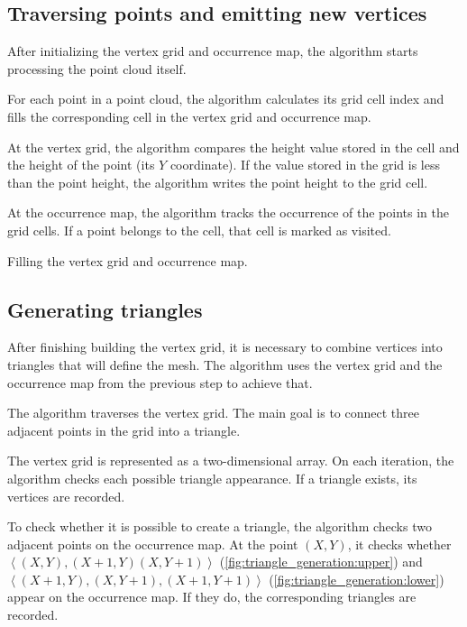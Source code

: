 \subsection{Traversing points and emitting new vertices}

After initializing the vertex grid and occurrence map, the algorithm starts processing the point cloud itself.

For each point in a point cloud, the algorithm  calculates its grid cell index and fills the corresponding cell in the vertex grid and occurrence map.

At the vertex grid, the algorithm compares the height value stored in the cell and the height of the point (its $Y$ coordinate). If the value stored in the grid is less than the point height, the algorithm writes the point height to the grid cell.

At the occurrence map, the algorithm tracks the occurrence of the points in the grid cells. If a point belongs to the cell, that cell is marked as visited.


\begin{algorithm}
    \caption{Filling the vertex grid and occurrence map.}

\end{algorithm}


\subsection{Generating triangles}

After finishing building the vertex grid, it is necessary to combine vertices into triangles that will define the mesh. The algorithm uses the vertex grid and the occurrence map from the previous step to achieve that.

The algorithm traverses the vertex grid. The main goal is to connect three adjacent points in the grid into a triangle.

The vertex grid is represented as a two-dimensional array. On each iteration, the algorithm checks each possible triangle appearance. If a triangle exists, its vertices are recorded.

To check whether it is possible to create a triangle, the algorithm checks two adjacent points on the occurrence map. At the point $(X, Y)$, it checks whether $\left \langle (X, Y), (X+1, Y) (X, Y+1) \right \rangle$ (\autoref{fig:triangle_generation:upper}) and $\left \langle (X+1, Y), (X, Y+1), (X+1, Y+1) \right \rangle$ (\autoref{fig:triangle_generation:lower}) appear on the occurrence map. If they do, the corresponding triangles are recorded.

